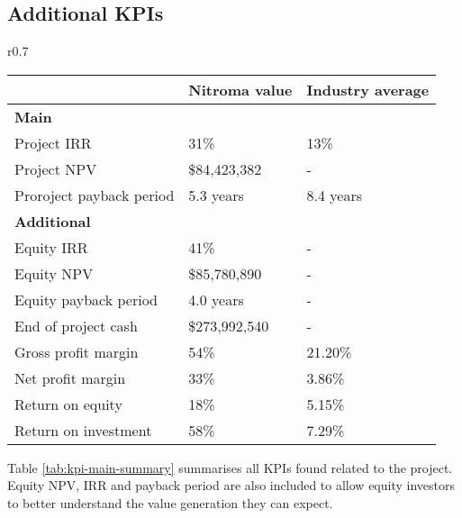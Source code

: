 \subsection{Additional KPIs}

\begin{wraptable}{r}{0.7\linewidth}
    \centering
    \caption{Summary of Nitroma's KPIs}
    \label{tab:kpi-main-summary}
\begin{tabular}{@{}lll@{}}
\toprule
                         & Nitroma value & Industry average \\ \midrule
\textbf{Main}            &               &                  \\
Project IRR              & 31\%          & 13\%             \\
Project NPV              & \$84,423,382  & -                \\
Proroject payback period & 5.3 years     & 8.4 years        \\
\textbf{Additional}      &               &                  \\
Equity IRR               & 41\%          & -                \\
Equity NPV               & \$85,780,890  & -                \\
Equity payback period    & 4.0 years     & -                \\
End of project cash      & \$273,992,540 & -                \\
Gross profit margin      & 54\%          & 21.20\%          \\
Net profit margin        & 33\%          & 3.86\%           \\
Return on equity         & 18\%          & 5.15\%           \\
Return on investment     & 58\%          & 7.29\%           \\ \bottomrule
\end{tabular}
\end{wraptable}

Table \ref{tab:kpi-main-summary} summarises all KPIs found related to the project. Equity NPV, IRR and payback period are also included to allow equity investors to better understand the value generation they can expect. 
\vspace{1.5cm}